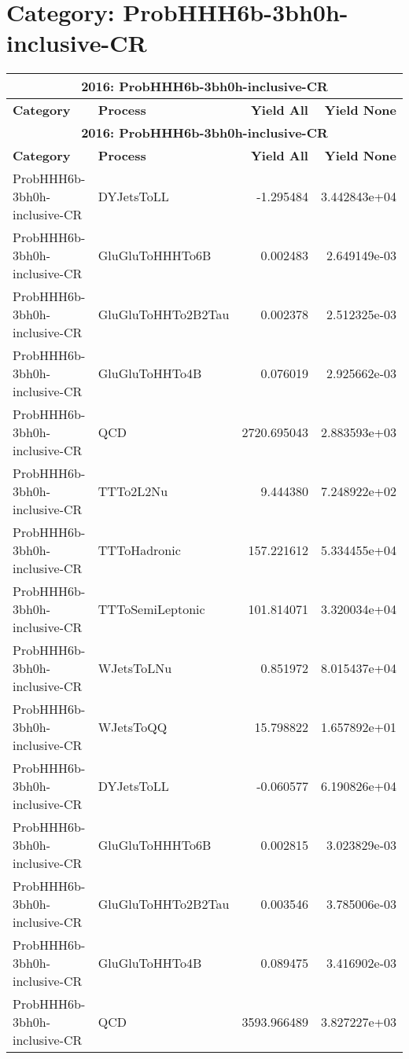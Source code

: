 \section*{Category: ProbHHH6b-3bh0h-inclusive-CR}
\begin{longtable}[c]{|l|l|r|r|}
\hline
\multicolumn{4}{|c|}{\textbf{2016: ProbHHH6b-3bh0h-inclusive-CR}} \\
\hline
\textbf{Category} & \textbf{Process} & \textbf{Yield All} & \textbf{Yield None} \\
\hline
\endfirsthead
\hline
\multicolumn{4}{|c|}{\textbf{2016: ProbHHH6b-3bh0h-inclusive-CR}} \\
\hline
\textbf{Category} & \textbf{Process} & \textbf{Yield All} & \textbf{Yield None} \\
\hline
\endhead
ProbHHH6b-3bh0h-inclusive-CR & DYJetsToLL & -1.295484 & 3.442843e+04 \\
\hline
ProbHHH6b-3bh0h-inclusive-CR & GluGluToHHHTo6B & 0.002483 & 2.649149e-03 \\
\hline
ProbHHH6b-3bh0h-inclusive-CR & GluGluToHHTo2B2Tau & 0.002378 & 2.512325e-03 \\
\hline
ProbHHH6b-3bh0h-inclusive-CR & GluGluToHHTo4B & 0.076019 & 2.925662e-03 \\
\hline
ProbHHH6b-3bh0h-inclusive-CR & QCD & 2720.695043 & 2.883593e+03 \\
\hline
ProbHHH6b-3bh0h-inclusive-CR & TTTo2L2Nu & 9.444380 & 7.248922e+02 \\
\hline
ProbHHH6b-3bh0h-inclusive-CR & TTToHadronic & 157.221612 & 5.334455e+04 \\
\hline
ProbHHH6b-3bh0h-inclusive-CR & TTToSemiLeptonic & 101.814071 & 3.320034e+04 \\
\hline
ProbHHH6b-3bh0h-inclusive-CR & WJetsToLNu & 0.851972 & 8.015437e+04 \\
\hline
ProbHHH6b-3bh0h-inclusive-CR & WJetsToQQ & 15.798822 & 1.657892e+01 \\
\hline
ProbHHH6b-3bh0h-inclusive-CR & DYJetsToLL & -0.060577 & 6.190826e+04 \\
\hline
ProbHHH6b-3bh0h-inclusive-CR & GluGluToHHHTo6B & 0.002815 & 3.023829e-03 \\
\hline
ProbHHH6b-3bh0h-inclusive-CR & GluGluToHHTo2B2Tau & 0.003546 & 3.785006e-03 \\
\hline
ProbHHH6b-3bh0h-inclusive-CR & GluGluToHHTo4B & 0.089475 & 3.416902e-03 \\
\hline
ProbHHH6b-3bh0h-inclusive-CR & QCD & 3593.966489 & 3.827227e+03 \\

\end{longtable}
